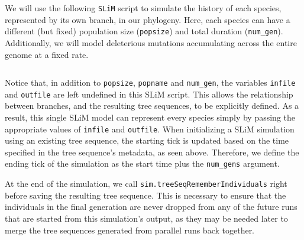 \documentclass[12pt]{article}
\newcommand{\slim}[0]{\texttt{SLiM}\xspace}
\begin{document}
We will use the following \slim script to simulate the history of each species, represented by its own branch, in our phylogeny. Here, each species can have a different
(but fixed) population size (\verb|popsize|) and total duration (\verb|num_gen|). Additionally, we will model deleterious mutations accumulating across the entire genome at a fixed rate.
%
\inputminted[breaklines, breakautoindent=true, breakanywhere=true, fontsize=\small, linenos, bgcolor=gray!10]{slim}{code/parallelizing_multiple_species/simulate_branch.slim}
%
Notice that, in addition to \verb|popsize|, \verb|popname| and \verb|num_gen|, the variables \verb|infile| and \verb|outfile| are left undefined in this SLiM script.
This allows the relationship between branches, and the
resulting tree sequences, to be explicitly defined. As a result, this single SLiM model can represent every species simply by passing the appropriate values of \verb|infile| and \verb|outfile|.
When initializing a SLiM simulation using an existing tree sequence, the starting tick is updated
based on the time specified in the tree sequence's metadata, as seen above.
Therefore, we define the ending tick of the simulation as the start time plus the \verb|num_gens| argument.


At the end of the simulation, we call \verb|sim.treeSeqRememberIndividuals| right before saving the resulting tree sequence.
This is necessary to ensure that the individuals in the final generation are never dropped from any of the future runs that are started from this simulation's output,
as they may be needed later to merge the tree sequences generated from parallel runs back together.
\end{document}
